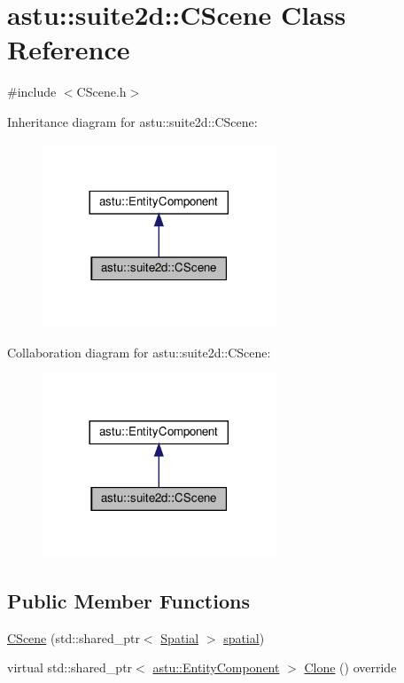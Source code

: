 \hypertarget{classastu_1_1suite2d_1_1CScene}{}\section{astu\+:\+:suite2d\+:\+:C\+Scene Class Reference}
\label{classastu_1_1suite2d_1_1CScene}


{\ttfamily \#include $<$C\+Scene.\+h$>$}



Inheritance diagram for astu\+:\+:suite2d\+:\+:C\+Scene\+:\nopagebreak
\begin{figure}[H]
\begin{center}
\leavevmode
\includegraphics[width=197pt]{classastu_1_1suite2d_1_1CScene__inherit__graph}
\end{center}
\end{figure}


Collaboration diagram for astu\+:\+:suite2d\+:\+:C\+Scene\+:\nopagebreak
\begin{figure}[H]
\begin{center}
\leavevmode
\includegraphics[width=197pt]{classastu_1_1suite2d_1_1CScene__coll__graph}
\end{center}
\end{figure}
\subsection*{Public Member Functions}
\begin{DoxyCompactItemize}
\item 
\hyperlink{classastu_1_1suite2d_1_1CScene_afdee9d9f1214ccfd36b44f68d5e351fa}{C\+Scene} (std\+::shared\+\_\+ptr$<$ \hyperlink{classastu_1_1suite2d_1_1Spatial}{Spatial} $>$ \hyperlink{classastu_1_1suite2d_1_1CScene_af8b497f2d0dac0c1bb4d7d3038280189}{spatial})
\item 
virtual std\+::shared\+\_\+ptr$<$ \hyperlink{classastu_1_1EntityComponent}{astu\+::\+Entity\+Component} $>$ \hyperlink{classastu_1_1suite2d_1_1CScene_ae8dad316175ec4bbfbdb7fff3c736cd3}{Clone} () override
\end{DoxyCompactItemize}
